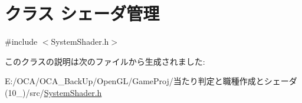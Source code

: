 \hypertarget{class_xE3_x82_xB7_xE3_x82_xA7_xE3_x83_xBC_xE3_x83_x80_xE7_xAE_xA1_xE7_x90_x86}{\section{クラス シェーダ管理}
\label{class_xE3_x82_xB7_xE3_x82_xA7_xE3_x83_xBC_xE3_x83_x80_xE7_xAE_xA1_xE7_x90_x86}
}


{\ttfamily \#include $<$System\-Shader.\-h$>$}



このクラスの説明は次のファイルから生成されました\-:\begin{DoxyCompactItemize}
\item 
E\-:/\-O\-C\-A/\-O\-C\-A\-\_\-\-Back\-Up/\-Open\-G\-L/\-Game\-Proj/当たり判定と職種作成とシェーダ(10\-\_)/src/\hyperlink{_system_shader_8h}{System\-Shader.\-h}\end{DoxyCompactItemize}
